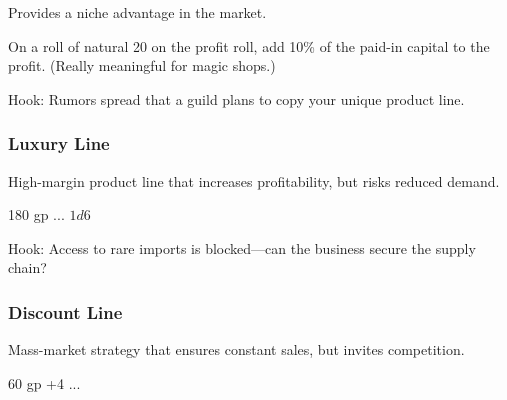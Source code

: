 \documentclass[twocolumn]{dndbook}
\begin{document}
Provides a niche advantage in the market.\par

\begin{DndComment}[color=bgtan2018]{}
	On a roll of natural 20 on the profit roll, add 10\% of the paid-in capital to the profit.
	(Really meaningful for magic shops.)
\end{DndComment}


Hook: Rumors spread that a guild plans to copy your unique product line.\par


\subsubsection{Luxury Line}


High-margin product line that increases profitability, but risks reduced demand.\par

\begin{DndComment}[color=bgtan2018]{}
	\hfill 180 gp
	\hfill ...
	\hfill $1d6$
\end{DndComment}


Hook: Access to rare imports is blocked—can the business secure the supply chain?\par


\subsubsection{Discount Line}


Mass-market strategy that ensures constant sales, but invites competition.\par

\begin{DndComment}[color=bgtan2018]{}
	\hfill 60 gp
	\hfill +4
	\hfill ...
\end{DndComment}
\end{document}
